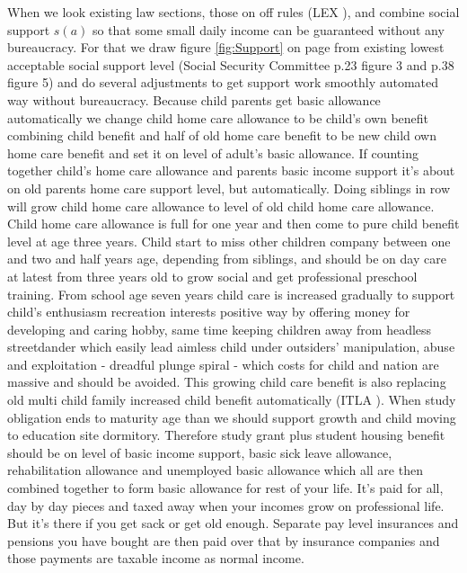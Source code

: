 When we look existing law sections, those on off rules (LEX \cite{LEX_2012_916en}),
and combine social support $s(a)$ so that some small daily income can be guaranteed without any bureaucracy.
For that we draw figure \ref{fig:Support} on page \pageref{fig:Support} from existing lowest acceptable social support level
(Social Security Committee \cite{VN_2023_26} p.23 figure 3 and p.38 figure 5)
and do several adjustments to get support work smoothly automated way without bureaucracy.
Because child parents get basic allowance automatically we change child home care allowance to be child's own benefit
combining child benefit and half of old home care benefit to be new child own home care benefit and set it on level of adult's basic allowance\cite{VN_2025_22}.
If counting together child's home care allowance and parents basic income support it's about on old parents home care support level, but automatically.
Doing siblings in row will grow child home care allowance to level of old child home care allowance.
Child home care allowance is full for one year and then come to pure child benefit level at age three years.
Child start to miss other children company between one and two and half years age, depending from siblings,
and should be on day care at latest from three years old to grow social and get professional preschool training.
From school age seven years child care is increased gradually to support child's enthusiasm recreation interests positive way by offering money for developing and caring hobby,
same time keeping children away from headless streetdander which easily lead aimless child under
outsiders' manipulation, abuse and exploitation - dreadful plunge spiral - which costs for child
and nation are massive and should be avoided.
This growing child care benefit is also replacing old multi child family increased child benefit automatically (ITLA \cite{ITLA_2023_LL}).
When study obligation ends to maturity age than we should support growth and child moving to education site dormitory.
Therefore study grant plus student housing benefit should be on level of basic income support,
basic sick leave allowance, rehabilitation allowance and unemployed basic allowance
which all are then combined together to form basic allowance for rest of your life.
It's paid for all, day by day pieces and taxed away when your incomes grow on professional life.
But it's there if you get sack or get old enough.
Separate pay level insurances and pensions you have bought are then paid over that by insurance companies
and those payments are taxable income as normal income.

